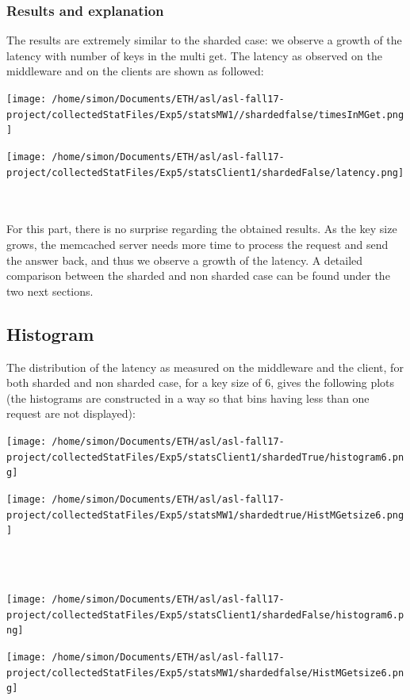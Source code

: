 \documentclass[11pt,a4paper]{article}
\begin{document}
\subsubsection{Results and explanation}

The results are extremely similar to the sharded case: we observe a growth of the latency with number of keys in the multi get. The latency as observed on the middleware and on the clients are shown as followed: 
\\
\begin{minipage}{0.5\linewidth}
\texttt{[image: /home/simon/Documents/ETH/asl/asl-fall17-project/collectedStatFiles/Exp5/statsMW1//shardedfalse/timesInMGet.png]}
\end{minipage}
\hfill
\begin{minipage}{0.5\linewidth}
\texttt{[image: /home/simon/Documents/ETH/asl/asl-fall17-project/collectedStatFiles/Exp5/statsClient1/shardedFalse/latency.png]}
\end{minipage}
\\\\
For this part, there is no surprise regarding the obtained results. As the key size grows, the memcached server needs more time to process the request and send the answer back, and thus we observe a growth of the latency. A detailed comparison between the sharded and non sharded case can be found under the two next sections. 

\subsection{Histogram}

The distribution of the latency as measured on the middleware and the client, for both sharded and non sharded case, for a key size of 6, gives the following plots (the histograms are constructed in a way so that bins having less than one request are not displayed):
\\
\begin{minipage}{0.5\linewidth}
\texttt{[image: /home/simon/Documents/ETH/asl/asl-fall17-project/collectedStatFiles/Exp5/statsClient1/shardedTrue/histogram6.png]}
\end{minipage}
\hfill
\begin{minipage}{0.5\linewidth}
\texttt{[image: /home/simon/Documents/ETH/asl/asl-fall17-project/collectedStatFiles/Exp5/statsMW1/shardedtrue/HistMGetsize6.png]}
\end{minipage}
\\
\\
\begin{minipage}{0.5\linewidth}
\texttt{[image: /home/simon/Documents/ETH/asl/asl-fall17-project/collectedStatFiles/Exp5/statsClient1/shardedFalse/histogram6.png]}
\end{minipage}
\hfill
\begin{minipage}{0.5\linewidth}
\texttt{[image: /home/simon/Documents/ETH/asl/asl-fall17-project/collectedStatFiles/Exp5/statsMW1/shardedfalse/HistMGetsize6.png]}
\end{minipage}
\end{document}

